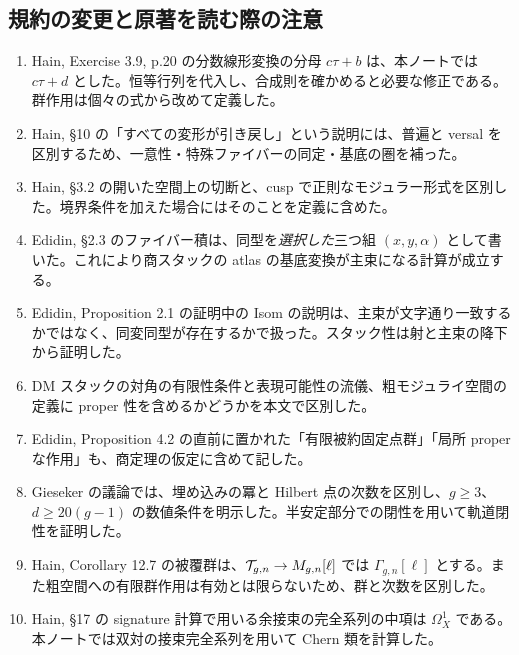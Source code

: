 \documentclass[dvipdfmx,a4paper,11pt]{article}
\theoremstyle{definition}
\begin{document}
\subsection{規約の変更と原著を読む際の注意}
\begin{enumerate}
\item Hain, Exercise 3.9, p.20 の分数線形変換の分母 $c\tau+b$ は、本ノートでは $c\tau+d$ とした。恒等行列を代入し、合成則を確かめると必要な修正である。群作用は個々の式から改めて定義した。
\item Hain, \S10 の「すべての変形が引き戻し」という説明には、普遍と versal を区別するため、一意性・特殊ファイバーの同定・基底の圏を補った。
\item Hain, \S3.2 の開いた空間上の切断と、cusp で正則なモジュラー形式を区別した。境界条件を加えた場合にはそのことを定義に含めた。
\item Edidin, \S2.3 のファイバー積は、同型を\emph{選択した}三つ組 $(x,y,\alpha)$ として書いた。これにより商スタックの atlas の基底変換が主束になる計算が成立する。
\item Edidin, Proposition 2.1 の証明中の Isom の説明は、主束が文字通り一致するかではなく、同変同型が存在するかで扱った。スタック性は射と主束の降下から証明した。
\item DM スタックの対角の有限性条件と表現可能性の流儀、粗モジュライ空間の定義に proper 性を含めるかどうかを本文で区別した。
\item Edidin, Proposition 4.2 の直前に置かれた「有限被約固定点群」「局所 proper な作用」も、商定理の仮定に含めて記した。
\item Gieseker の議論では、埋め込みの冪と Hilbert 点の次数を区別し、$g\ge3$、$d\ge20(g-1)$ の数値条件を明示した。半安定部分での閉性を用いて軌道閉性を証明した。
\item Hain, Corollary 12.7 の被覆群は、$\mathcal T_{g,n}\to M_{g,n}[\ell]$ では $\Gamma_{g,n}[\ell]$ とする。また粗空間への有限群作用は有効とは限らないため、群と次数を区別した。
\item Hain, \S17 の signature 計算で用いる余接束の完全系列の中項は $\Omega_X^1$ である。本ノートでは双対の接束完全系列を用いて Chern 類を計算した。
\end{enumerate}
\end{document}
